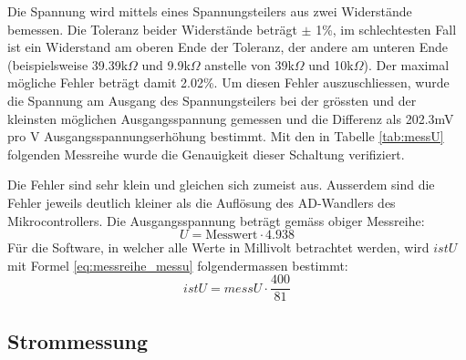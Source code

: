 Die Spannung wird mittels eines Spannungsteilers aus zwei Widerstände bemessen. Die Toleranz beider Widerstände beträgt $\pm$ 1\%, im schlechtesten Fall ist ein Widerstand am oberen Ende der Toleranz, der andere am unteren Ende (beispielsweise 39.39k$\Omega$ und 9.9k$\Omega$ anstelle von 39k$\Omega$ und 10k$\Omega$). Der maximal mögliche Fehler beträgt damit 2.02\%. \newline
Um diesen Fehler auszuschliessen, wurde die Spannung am Ausgang des Spannungsteilers bei der grössten und der kleinsten möglichen Ausgangsspannung gemessen und die Differenz als 202.3mV pro V Ausgangsspannungserhöhung bestimmt. Mit den in Tabelle \ref{tab:messU} folgenden Messreihe wurde die Genauigkeit dieser Schaltung verifiziert.

Die Fehler sind sehr klein und gleichen sich zumeist aus. Ausserdem sind die Fehler jeweils deutlich kleiner als die Auflösung des AD-Wandlers des Mikrocontrollers. Die Ausgangsspannung beträgt gemäss obiger Messreihe:
\begin{equation}
	U=\text{Messwert}\cdot 4.938
\label{eq:messreihe_messu}
\end{equation}
Für die Software, in welcher alle Werte in Millivolt betrachtet werden, wird $istU$ mit Formel \ref{eq:messreihe_messu} folgendermassen bestimmt:
\begin{equation}
	istU=messU\cdot\frac{400}{81}
\label{eq:messreihe_messu_sw}
\end{equation}


\subsection{Strommessung}\label{subsec_messi}

